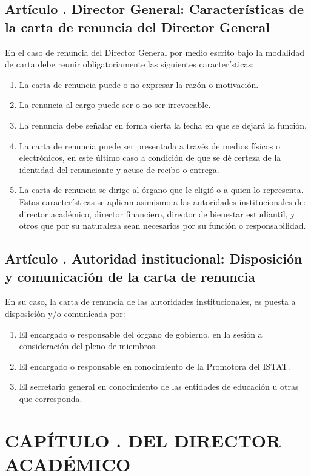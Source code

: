 \subsection{Artículo . Director General: Características de la carta de renuncia del Director General}
\addtocounter{ns}{1}
En el caso de renuncia del Director General por medio escrito bajo la modalidad de carta debe reunir obligatoriamente las siguientes características: 
\begin{enumerate}
\item La carta de renuncia puede o no expresar la razón o motivación.  
\item La renuncia al cargo puede ser o no ser irrevocable.  
\item La renuncia debe señalar en forma cierta la fecha en que se dejará la función. 
\item La carta de renuncia puede ser presentada a través de medios físicos o electrónicos, en este último caso a condición de que se dé certeza de la identidad del renunciante y acuse de recibo o entrega.  
\item La carta de renuncia se dirige al órgano que le eligió o a quien lo representa. Estas características se aplican asimismo a las autoridades institucionales de: director académico, director financiero, director de bienestar estudiantil, y otros que por su naturaleza sean necesarios por su función o responsabilidad. 
\end{enumerate}
\subsection{Artículo . Autoridad institucional: Disposición y comunicación de la carta de renuncia}
\addtocounter{ns}{1}
En su caso, la carta de renuncia de las autoridades institucionales, es puesta a disposición y/o comunicada por: 
\begin{enumerate}
\item El encargado o responsable del órgano de gobierno, en la sesión a consideración del pleno de miembros. 
\item El encargado o responsable en conocimiento de la Promotora del ISTAT. 
\item El secretario general en conocimiento de las entidades de educación u otras que corresponda.  
\end{enumerate}

\section{CAPÍTULO . DEL DIRECTOR ACADÉMICO}
\addtocounter{re}{1}
